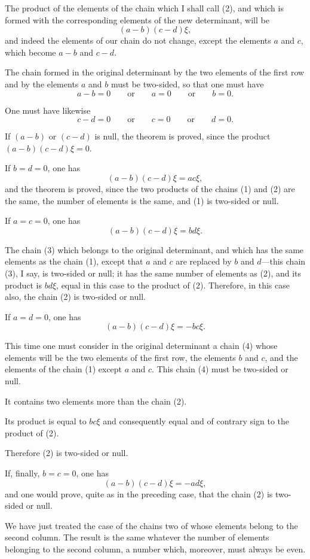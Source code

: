 \documentclass{article}
\begin{document}
The product of the elements of the chain which I shall call (2), and which is formed with the corresponding elements of the new determinant, will be
\[ (a-b)(c-d)\xi, \]
and indeed the elements of our chain do not change, except the elements $a$ and $c$, which become $a-b$ and $c-d$.

The chain formed in the original determinant by the two elements of the first row and by the elements $a$ and $b$ must be two-sided, so that one must have
\[ a-b = 0 \qquad \text{or} \qquad a = 0 \qquad \text{or} \qquad b = 0. \]

One must have likewise
\[ c-d = 0 \qquad \text{or} \qquad c = 0 \qquad \text{or} \qquad d = 0. \]

If $(a-b)$ or $(c-d)$ is null, the theorem is proved, since the product $(a-b)(c-d)\xi = 0$.

If $b = d = 0$, one has
\[ (a-b)(c-d)\xi = ac\xi, \]
and the theorem is proved, since the two products of the chains (1) and (2) are the same, the number of elements is the same, and (1) is two-sided or null.

If $a = c = 0$, one has
\[ (a-b)(c-d)\xi = bd\xi. \]

The chain (3) which belongs to the original determinant, and which has the same elements as the chain (1), except that $a$ and $c$ are replaced by $b$ and $d$---this chain (3), I say, is two-sided or null; it has the same number of elements as (2), and its product is $bd\xi$, equal in this case to the product of (2). Therefore, in this case also, the chain (2) is two-sided or null.

If $a = d = 0$, one has
\[ (a-b)(c-d)\xi = -bc\xi. \]

This time one must consider in the original determinant a
chain (4) whose elements will be the two elements of the first row, the elements $b$ and $c$, and the elements of the chain (1) except $a$ and $c$. This chain (4) must be two-sided or null.

It contains two elements more than the chain (2).

Its product is equal to $bc\xi$ and consequently equal and of contrary sign to the product of (2).

Therefore (2) is two-sided or null.

If, finally, $b = c = 0$, one has
\[ (a-b)(c-d)\xi = -ad\xi, \]
and one would prove, quite as in the preceding case, that the chain (2) is two-sided or null.

We have just treated the case of the chains two of whose elements belong to the second column. The result is the same whatever the number of elements belonging to the second column, a number which, moreover, must always be even.
\end{document}
